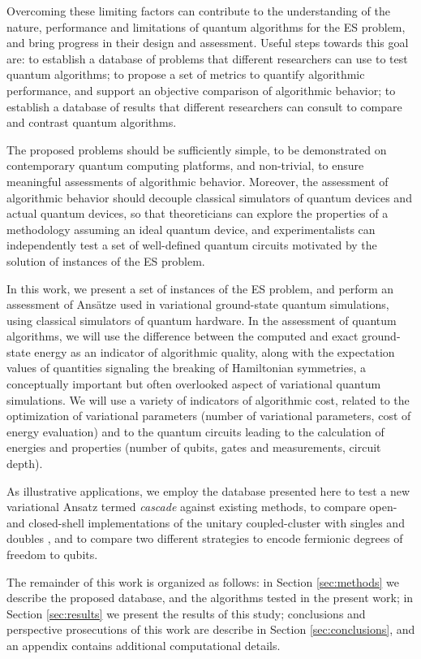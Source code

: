 \documentclass[aps,pra,twocolumn]{revtex4-2}
\begin{document}
Overcoming these limiting factors can contribute to the understanding of the nature, performance and limitations of quantum algorithms for the ES problem, and bring progress in their design and assessment.
Useful steps towards this goal are:
to establish a database of problems that different researchers can use to test quantum algorithms;
to propose a set of metrics to quantify algorithmic performance, and support an objective comparison of algorithmic behavior;
to establish a database of results that different researchers can consult to compare and contrast quantum algorithms.

The proposed problems should be sufficiently simple, to be demonstrated on contemporary quantum computing platforms, and non-trivial, to ensure meaningful assessments of algorithmic behavior.
Moreover, the assessment of algorithmic behavior should decouple classical simulators of quantum devices and actual quantum devices,
so that theoreticians can explore the properties of a methodology assuming an ideal quantum device, and experimentalists can independently test a set of well-defined quantum circuits motivated by the solution of instances of the ES problem.
 
In this work, we present a set of instances of the ES problem, and perform an assessment of Ans\"{a}tze used in variational ground-state quantum simulations,
using classical simulators of quantum hardware.
In the assessment of quantum algorithms, we will use the difference between the computed and exact ground-state energy as an indicator of algorithmic quality,
along with the expectation values of quantities signaling the breaking of Hamiltonian symmetries, a conceptually important but often overlooked aspect of variational quantum simulations.
We will use a variety of indicators of algorithmic cost, related to the optimization of variational parameters (number of variational parameters, cost of energy evaluation)
and to the quantum circuits leading to the calculation of energies and properties (number of qubits, gates and measurements, circuit depth).

As illustrative applications, we employ the database presented here to test a new variational Ansatz termed {\em{cascade}} against existing methods,
to compare open- and closed-shell implementations of the unitary coupled-cluster with singles and doubles \cite{scuseria1987closed,szalay1997spin}, 
and to compare two different strategies to encode fermionic degrees of freedom to qubits.

The remainder of this work is organized as follows: 
in Section \ref{sec:methods} we describe the proposed database, and the algorithms tested in the present work;
in Section \ref{sec:results} we present the results of this study;
conclusions and perspective prosecutions of this work are describe in Section \ref{sec:conclusions},
and an appendix contains additional computational details.
\end{document}
